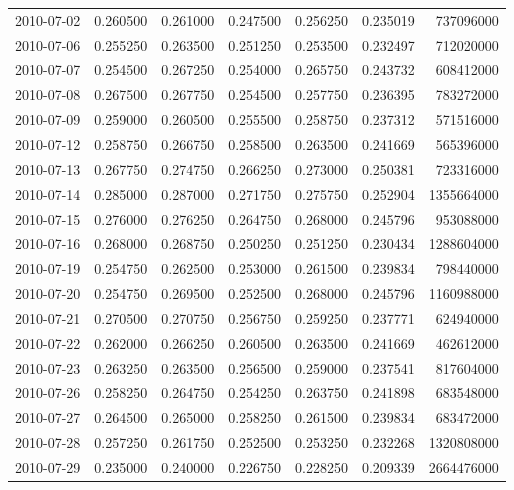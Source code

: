 \begin{tabular}{lrrrrrr}
2010-07-02 &    0.260500 &    0.261000 &    0.247500 &    0.256250 &    0.235019 &   737096000 \\
2010-07-06 &    0.255250 &    0.263500 &    0.251250 &    0.253500 &    0.232497 &   712020000 \\
2010-07-07 &    0.254500 &    0.267250 &    0.254000 &    0.265750 &    0.243732 &   608412000 \\
2010-07-08 &    0.267500 &    0.267750 &    0.254500 &    0.257750 &    0.236395 &   783272000 \\
2010-07-09 &    0.259000 &    0.260500 &    0.255500 &    0.258750 &    0.237312 &   571516000 \\
2010-07-12 &    0.258750 &    0.266750 &    0.258500 &    0.263500 &    0.241669 &   565396000 \\
2010-07-13 &    0.267750 &    0.274750 &    0.266250 &    0.273000 &    0.250381 &   723316000 \\
2010-07-14 &    0.285000 &    0.287000 &    0.271750 &    0.275750 &    0.252904 &  1355664000 \\
2010-07-15 &    0.276000 &    0.276250 &    0.264750 &    0.268000 &    0.245796 &   953088000 \\
2010-07-16 &    0.268000 &    0.268750 &    0.250250 &    0.251250 &    0.230434 &  1288604000 \\
2010-07-19 &    0.254750 &    0.262500 &    0.253000 &    0.261500 &    0.239834 &   798440000 \\
2010-07-20 &    0.254750 &    0.269500 &    0.252500 &    0.268000 &    0.245796 &  1160988000 \\
2010-07-21 &    0.270500 &    0.270750 &    0.256750 &    0.259250 &    0.237771 &   624940000 \\
2010-07-22 &    0.262000 &    0.266250 &    0.260500 &    0.263500 &    0.241669 &   462612000 \\
2010-07-23 &    0.263250 &    0.263500 &    0.256500 &    0.259000 &    0.237541 &   817604000 \\
2010-07-26 &    0.258250 &    0.264750 &    0.254250 &    0.263750 &    0.241898 &   683548000 \\
2010-07-27 &    0.264500 &    0.265000 &    0.258250 &    0.261500 &    0.239834 &   683472000 \\
2010-07-28 &    0.257250 &    0.261750 &    0.252500 &    0.253250 &    0.232268 &  1320808000 \\
2010-07-29 &    0.235000 &    0.240000 &    0.226750 &    0.228250 &    0.209339 &  2664476000 \\

\end{tabular}
